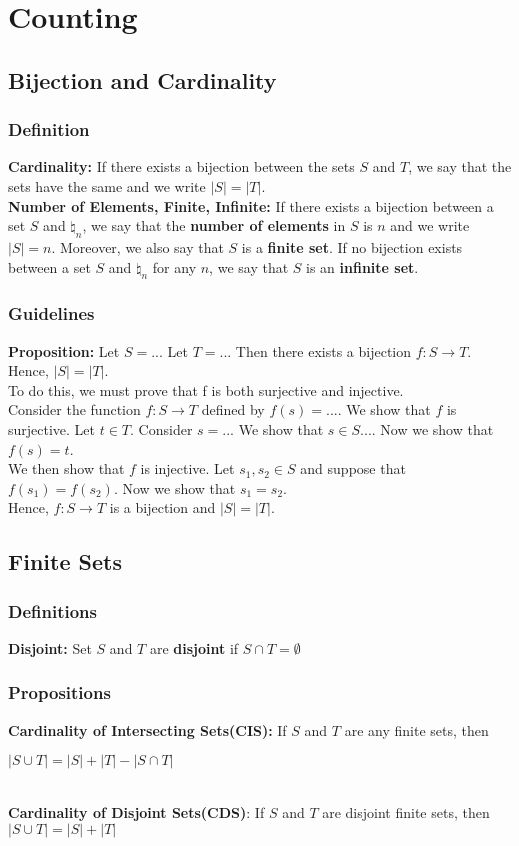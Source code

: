 \documentclass[12pt]{report}
\begin{document}
\chapter{Counting}
	\section{Bijection and Cardinality}
		\subsection{Definition}
			\textbf{Cardinality:} If there exists a bijection between the sets $S$ and $T$, we say that the sets have the same and we write $|S| = |T|$. \\
			\textbf{Number of Elements, Finite, Infinite:} If there exists a bijection between a set $S$ and $\natural_n$, we say that the \textbf{number of elements} in $S$ is $n$ and we write $|S| = n$. Moreover, we also say that $S$ is a \textbf{finite set}. If no bijection exists between a set $S$ and $\natural_n$ for any $n$, we say that $S$ is an \textbf{infinite set}.
		\subsection{Guidelines}
			\textbf{Proposition:} Let $S = ...$ Let $T = ...$ Then there exists a bijection $f: S \rightarrow T$. Hence, $|S| = |T|$. \\
			To do this, we must prove that f is both surjective and injective. \\
			Consider the function $f:S \rightarrow T$ defined by $f(s) = ...$. We show that $f$ is surjective. Let $t \in T$. Consider $s = ...$ We show that $s \in S ...$. Now we show that $f(s) = t$.\\ We then show that $f$ is injective. Let $s_1, s_2 \in S$ and suppose that $f(s_1) = f(s_2)$. Now we show that $s_1 = s_2$.\\
			Hence, $f:S \rightarrow T$ is a bijection and $|S| = |T|$.
	\section{Finite Sets}
		\subsection{Definitions}
			\textbf{Disjoint:} Set $S$ and $T$ are \textbf{disjoint} if $S \cap T = \emptyset$
			
		\subsection{Propositions}
			\textbf{Cardinality of Intersecting Sets(CIS):} If $S$ and $T$ are any finite sets, then \\
			\centerline{$|S \cup T| = |S| + |T| - |S \cap T|$}\\
			\textbf{Cardinality of Disjoint Sets(CDS)}: If $S$ and $T$ are disjoint finite sets, then $|S \cup T| = |S| + |T|$\\
			
\end{document}
